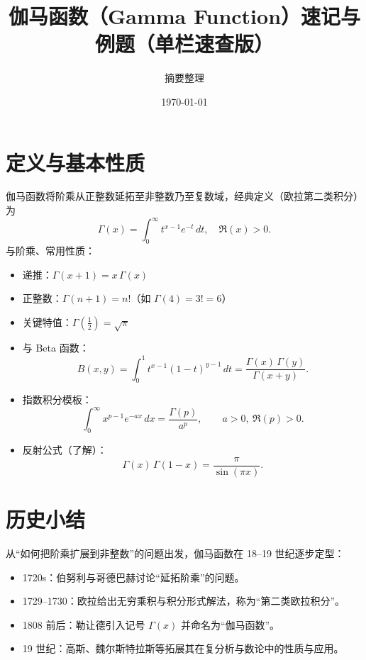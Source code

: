\documentclass[UTF8,a4paper,12pt]{ctexart}
\title{伽马函数（Gamma Function）速记与例题（单栏速查版）}
\author{\small 摘要整理}
\date{\small \today}
\numberwithin{equation}{section}
\begin{document}
\maketitle

\section{定义与基本性质}
伽马函数将阶乘从正整数延拓至非整数乃至复数域，经典定义（欧拉第二类积分）为
\begin{equation}
\Gamma(x) = \int_0^{\infty} t^{x-1} e^{-t} \, dt,\quad \Re(x)>0.
\end{equation}
与阶乘、常用性质：
\begin{itemize}
  \item 递推：\(\Gamma(x+1) = x\,\Gamma(x)\)
  \item 正整数：\(\Gamma(n+1) = n!\)（如 \(\Gamma(4)=3!=6\)）
  \item 关键特值：\(\Gamma(\tfrac{1}{2}) = \sqrt{\pi}\)
  \item 与 Beta 函数：
  \begin{equation}
    B(x,y) = \int_0^1 t^{x-1} (1-t)^{y-1} \, dt
    = \frac{\Gamma(x)\,\Gamma(y)}{\Gamma(x+y)}.
  \end{equation}
  \item 指数积分模板：
  \begin{equation}
    \int_0^{\infty} x^{p-1} e^{-a x} \, dx = \frac{\Gamma(p)}{a^p},\qquad a>0,\ \Re(p)>0.
  \end{equation}
  \item 反射公式（了解）：
  \begin{equation}
    \Gamma(x)\,\Gamma(1-x) = \frac{\pi}{\sin(\pi x)}.
  \end{equation}
\end{itemize}

\section{历史小结}
从“如何把阶乘扩展到非整数”的问题出发，伽马函数在 18–19 世纪逐步定型：
\begin{itemize}
  \item 1720s：伯努利与哥德巴赫讨论“延拓阶乘”的问题。
  \item 1729–1730：欧拉给出无穷乘积与积分形式解法，称为“第二类欧拉积分”。
  \item 1808 前后：勒让德引入记号 \(\Gamma(x)\) 并命名为“伽马函数”。
  \item 19 世纪：高斯、魏尔斯特拉斯等拓展其在复分析与数论中的性质与应用。
\end{itemize}
\end{document}

